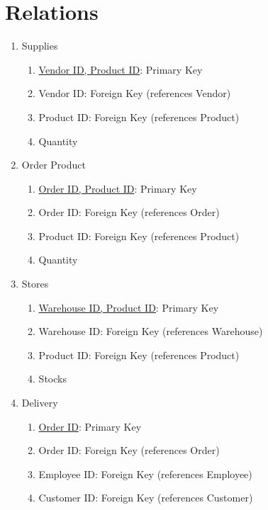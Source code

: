 \documentclass[12pt]{report}
\begin{document}
    \section{Relations}
        \begin{enumerate}
             \item Supplies
            \begin{enumerate}
                \item \underline{Vendor ID, Product ID}: Primary Key
                \item Vendor ID: Foreign Key (references Vendor)
                \item Product ID: Foreign Key (references Product)
                \item Quantity
            \end{enumerate}
            \item Order Product
            \begin{enumerate}
                \item \underline{Order ID, Product ID}: Primary Key 
                \item Order ID: Foreign Key (references Order)
                \item Product ID: Foreign Key (references Product)
                \item Quantity
            \end{enumerate}
            \item Stores
            \begin{enumerate}
                \item \underline{Warehouse ID, Product ID}: Primary Key
                \item Warehouse ID: Foreign Key (references Warehouse)
                \item Product ID: Foreign Key (references Product)
                \item Stocks
            \end{enumerate}
            \item Delivery
            \begin{enumerate}
                \item \underline{Order ID}: Primary Key
                \item Order ID: Foreign Key (references Order)
                \item Employee ID: Foreign Key (references Employee)
                \item Customer ID: Foreign Key (references Customer)

\end{enumerate}
\end{enumerate}
\end{document}
